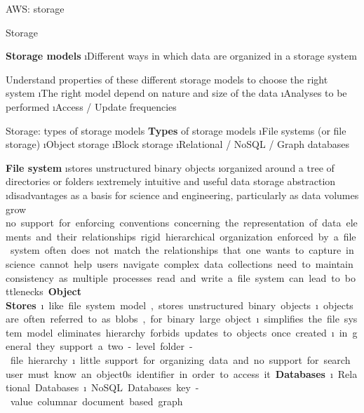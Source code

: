 \begin{frame}[allowframebreaks]{AWS: storage}

\end{frame}


\begin{frame}[allowframebreaks]{Storage}

\textbf{Storage models}
\i Different ways in which data are organized in a storage system

Understand properties of these different storage models to choose the right system
\i The right model depend on nature and size of the data
\i Analyses to be performed
\i Access / Update frequencies
\end{frame}

\begin{frame}[allowframebreaks]{Storage: types of storage models}
\textbf{Types} of storage models
\i File systems (or file storage)
\i Object storage
\i Block storage
\i Relational / NoSQL / Graph databases

\textbf{File system} 
\i stores unstructured binary objects
\i organized around a tree of directories or folders
\i extremely intuitive and useful data storage abstraction
\i disadvantages as a basis for science and engineering, particularly as data volumes grow
\si no support for enforcing conventions concerning the representation of data elements and their relationships
\si rigid hierarchical organization enforced by a file system often does not match the relationships that one wants to capture in science.
\si cannot help users navigate complex data collections
\si need to maintain consistency as multiple processes read and write a file system can lead to bottlenecks

\textbf{Object Stores}
\i like file system model, stores unstructured binary objects
\i objects are often referred to as blobs, for binary large object
\i simplifies the file system model
\si eliminates hierarchy 
\si forbids updates to objects once created
\i in general they support a two-level folder-file hierarchy
\i little support for organizing data and no support for search
\si user must know an object0s identifier in order to access it

\textbf{Databases} 
\i Relational Databases
\i NoSQL Databases
\si key-value
\si columnar
\si document based
\si graph


\end{frame}
